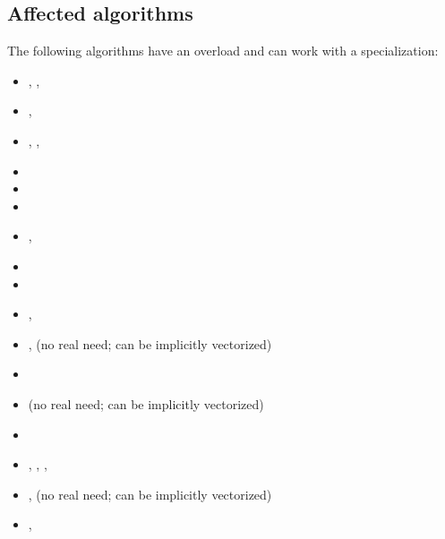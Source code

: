 \subsection{Affected algorithms}
The following algorithms have an  overload and can work with a \simdEPT specialization:
\begin{itemize}
  \item {}, , 
  \item {}, 
  \item {}, , 
  \item {}
  \item {}
  \item {}
  \item {}, 
  \item {}
  \item {}
  \item {}, 
  \item {},  (no real need; can be implicitly vectorized)
  \item {}
  \item {} (no real need; can be implicitly vectorized)
  \item {}
  \item {}, , , 
  \item {},  (no real need; can be implicitly vectorized)
  \item {}, 


\end{itemize}
